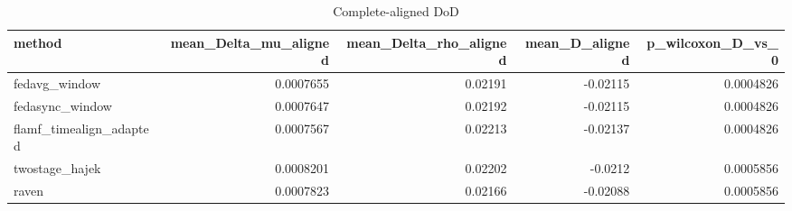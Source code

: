 \begin{table}
\caption{Complete-aligned DoD}
\label{tab:table_e2c}
\begin{tabular}{lrrrr}
\toprule
method & mean_Delta_mu_aligned & mean_Delta_rho_aligned & mean_D_aligned & p_wilcoxon_D_vs_0 \\
\midrule
fedavg_window & 0.0007655 & 0.02191 & -0.02115 & 0.0004826 \\
fedasync_window & 0.0007647 & 0.02192 & -0.02115 & 0.0004826 \\
flamf_timealign_adapted & 0.0007567 & 0.02213 & -0.02137 & 0.0004826 \\
twostage_hajek & 0.0008201 & 0.02202 & -0.0212 & 0.0005856 \\
raven & 0.0007823 & 0.02166 & -0.02088 & 0.0005856 \\
\bottomrule
\end{tabular}
\end{table}
